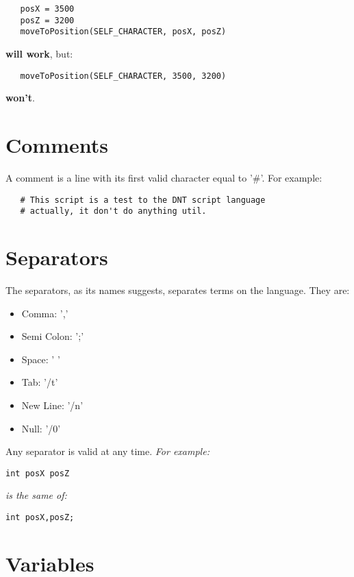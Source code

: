 \documentclass[ letterpaper,12pt]{article}
\begin{document}
\begin{verbatim}
   posX = 3500
   posZ = 3200
   moveToPosition(SELF_CHARACTER, posX, posZ)
\end{verbatim}

{\bf will work}, but:

\begin{verbatim}
   moveToPosition(SELF_CHARACTER, 3500, 3200)
\end{verbatim}

{\bf won't}.

\section{Comments}
 
   A comment is a line with its first valid character equal to '\#'. For example:

\begin{verbatim}
   # This script is a test to the DNT script language
   # actually, it don't do anything util.
\end{verbatim}

\section{Separators}

The separators, as its names suggests, separates terms on the language. They are:

\begin{itemize}
\item{Comma: ','}
\item{Semi Colon: ';'}
\item{Space: ' '}
\item{Tab: '/t'}
\item{New Line: '/n'}
\item{Null: '/0'}
\end{itemize}

Any separator is valid at any time. {\it For example:}

\begin{verbatim}
int posX posZ
\end{verbatim}

{\it is the same of:}

\begin{verbatim}
int posX,posZ;
\end{verbatim}

\section{Variables}
\end{document}
